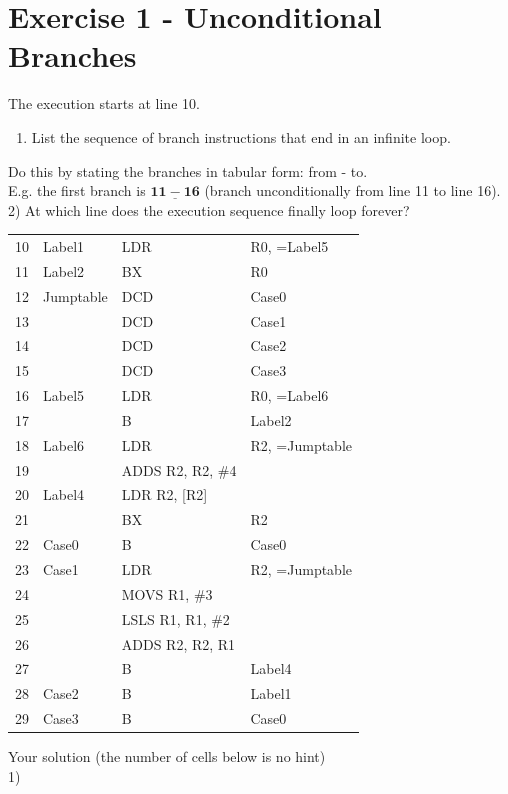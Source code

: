 \section*{Exercise 1 - Unconditional Branches}
The execution starts at line 10.

\begin{enumerate}
  \item List the sequence of branch instructions that end in an infinite loop.
\end{enumerate}

Do this by stating the branches in tabular form: from - to.\\
E.g. the first branch is $\underline{\mathbf{1 1 - 1 6}}$ (branch unconditionally from line 11 to line 16).\\
2) At which line does the execution sequence finally loop forever?

\begin{center}
\begin{tabular}{|l|lll|}
\hline
10 & Label1 & LDR & R0, =Label5 \\
11 & Label2 & BX & R0 \\
12 & Jumptable & DCD & Case0 \\
13 &  & DCD & Case1 \\
14 &  & DCD & Case2 \\
15 &  & DCD & Case3 \\
16 & Label5 & LDR & R0, =Label6 \\
17 &  & B & Label2 \\
18 & Label6 & LDR & R2, =Jumptable \\
19 &  & ADDS R2, R2, \#4 &  \\
20 & Label4 & LDR R2, [R2] &  \\
21 &  & BX & R2 \\
22 & Case0 & B & Case0 \\
23 & Case1 & LDR & R2, =Jumptable \\
24 &  & MOVS R1, \#3 &  \\
25 &  & LSLS R1, R1, \#2 &  \\
26 &  & ADDS R2, R2, R1 &  \\
27 &  & B & Label4 \\
28 & Case2 & B & Label1 \\
29 & Case3 & B & Case0 \\
\hline
\end{tabular}
\end{center}

Your solution (the number of cells below is no hint)\\
1)

